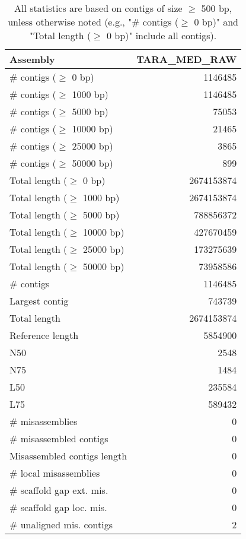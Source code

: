 \documentclass[12pt,a4paper]{article}
\begin{document}
\begin{table}[ht]
\begin{center}
\caption{All statistics are based on contigs of size $\geq$ 500 bp, unless otherwise noted (e.g., "\# contigs ($\geq$ 0 bp)" and "Total length ($\geq$ 0 bp)" include all contigs).}
\begin{tabular}{|l*{1}{|r}|}
\hline
Assembly & TARA\_MED\_RAW \\ \hline
\# contigs ($\geq$ 0 bp) & 1146485 \\ \hline
\# contigs ($\geq$ 1000 bp) & 1146485 \\ \hline
\# contigs ($\geq$ 5000 bp) & 75053 \\ \hline
\# contigs ($\geq$ 10000 bp) & 21465 \\ \hline
\# contigs ($\geq$ 25000 bp) & 3865 \\ \hline
\# contigs ($\geq$ 50000 bp) & 899 \\ \hline
Total length ($\geq$ 0 bp) & 2674153874 \\ \hline
Total length ($\geq$ 1000 bp) & 2674153874 \\ \hline
Total length ($\geq$ 5000 bp) & 788856372 \\ \hline
Total length ($\geq$ 10000 bp) & 427670459 \\ \hline
Total length ($\geq$ 25000 bp) & 173275639 \\ \hline
Total length ($\geq$ 50000 bp) & 73958586 \\ \hline
\# contigs & 1146485 \\ \hline
Largest contig & 743739 \\ \hline
Total length & 2674153874 \\ \hline
Reference length & 5854900 \\ \hline
N50 & 2548 \\ \hline
N75 & 1484 \\ \hline
L50 & 235584 \\ \hline
L75 & 589432 \\ \hline
\# misassemblies & 0 \\ \hline
\# misassembled contigs & 0 \\ \hline
Misassembled contigs length & 0 \\ \hline
\# local misassemblies & 0 \\ \hline
\# scaffold gap ext. mis. & 0 \\ \hline
\# scaffold gap loc. mis. & 0 \\ \hline
\# unaligned mis. contigs & 2 \\ \hline

\end{tabular}
\end{center}
\end{table}
\end{document}
